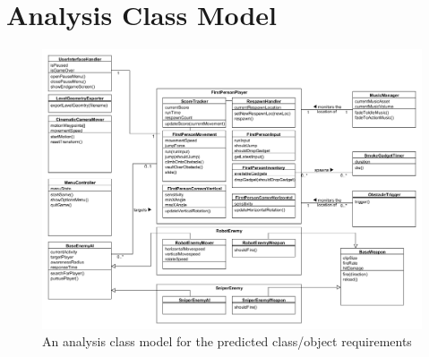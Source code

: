 \documentclass[a4paper,10pt]{article}
\begin{document}
\section{Analysis Class Model}
\begin{figure}[H]
	\begin{center}
		\includegraphics[scale=0.4]{images/AnalysisClassDiagram.png}
		\caption{An analysis class model for the predicted class/object requirements}
	\end{center}
\end{figure}
\end{document}
